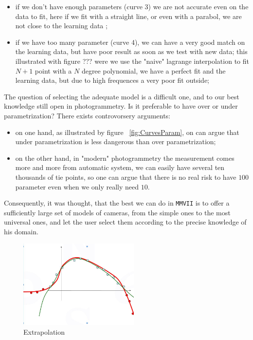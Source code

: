 \begin{itemize}
	\item if we don't have enough parameters (curve 3) we are not accurate  even on the data to fit,
	   here if we fit with a straight line, or even with a parabol, we are not close to the learning data ;

   \item if we  have too many parameter (curve 4), we can have a very good match on the learning data, but have 
	 poor result as soon as we test with new data; this illustrated with  figure ??? were
         we use the "naive" lagrange interpolation to fit $N+1$ point with a $N$ degree polynomial,
         we have a perfect fit and the learning data, but due to high frequences a very poor fit outside;
\end{itemize}

The question of selecting the adequate model is a difficult one, and to our best knowledge
still open in photogrammetry.  Is it preferable to have over or under parametrization? There
exists controvorsery arguments:


\begin{itemize}
   \item  on one hand, as illustrated by figure ~\ref{fig:CurvesParam}, on can argue that under parametrization is less dangerous
         than over parametrization;

   \item  on the other hand, in "modern" photogrammetry the measurement comes more and more from automatic system,
          we can easily have several ten thousands of tie points, so one can argue that there is no real risk to have $100$ parameter
          even when we only really need $10$.
\end{itemize}

Consequently, it was thought, that the best we can do in {\tt MMVII} is to offer a sufficiently large set of models
of cameras, from the simple ones to the most universal ones, and let the user select them according to
the precise knowledge of his domain. 

\begin{figure}
\centering
	\includegraphics[width=6cm]{Methods/Images/CourbeExrapol.jpg}
	\caption{Extrapolation}
	\label{fig:CurvesExtrpol}
\end{figure}

